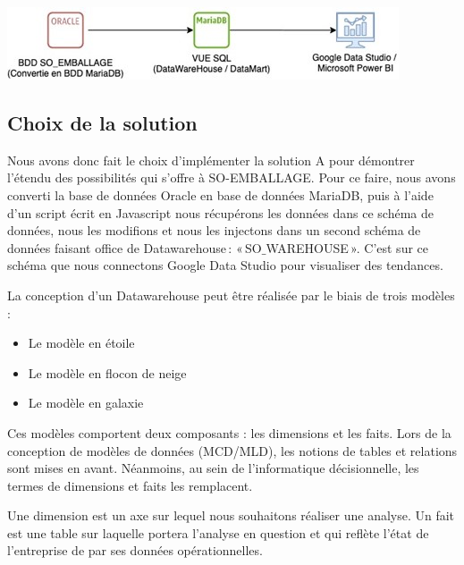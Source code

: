 \begin{center}
	\includegraphics[scale=1]{images/solution_b.jpg} 
\end{center}  

\subsection{Choix de la solution}  

Nous avons donc fait le choix d’implémenter la solution A pour démontrer l’étendu des possibilités qui s’offre à SO-EMBALLAGE. Pour ce faire, nous avons converti la base de données Oracle en base de données MariaDB, puis à l’aide d’un script écrit en Javascript nous récupérons les données dans ce schéma de données, nous les modifions et nous les injectons dans un second schéma de données faisant office de Datawarehouse : « SO$\_$WAREHOUSE ». C’est sur ce schéma que nous connectons Google Data Studio pour visualiser des tendances.   

La conception d’un Datawarehouse peut être réalisée par le biais de trois modèles : 
\begin{itemize}[label=\textbullet, font=\LARGE \color{listGreen}]
	\item Le modèle en étoile 
	\item Le modèle en flocon de neige 
	\item Le modèle en galaxie 
\end{itemize} 

Ces modèles comportent deux composants : les dimensions et les faits.  Lors de la conception de modèles de données (MCD/MLD), les notions de tables et relations sont mises en avant. Néanmoins, au sein de l’informatique décisionnelle, les termes de dimensions et faits les remplacent. 

Une dimension est un axe sur lequel nous souhaitons réaliser une analyse. Un fait est une table sur laquelle portera l’analyse en question et qui reflète l’état de l’entreprise de par ses données opérationnelles.   

